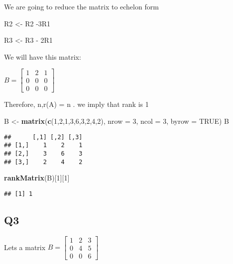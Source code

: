 \documentclass[
]{article}
\newenvironment{Shaded}{\begin{snugshade}}{\end{snugshade}}
\newcommand{\AttributeTok}[1]{\textcolor[rgb]{0.13,0.29,0.53}{#1}}
\newcommand{\ConstantTok}[1]{\textcolor[rgb]{0.56,0.35,0.01}{#1}}
\newcommand{\DecValTok}[1]{\textcolor[rgb]{0.00,0.00,0.81}{#1}}
\newcommand{\FunctionTok}[1]{\textcolor[rgb]{0.13,0.29,0.53}{\textbf{#1}}}
\newcommand{\NormalTok}[1]{#1}
\newcommand{\OtherTok}[1]{\textcolor[rgb]{0.56,0.35,0.01}{#1}}
\begin{document}
We are going to reduce the matrix to echelon form

R2 \textless- R2 -3R1

R3 \textless- R3 - 2R1

We will have this matrix:

\(B = \begin{bmatrix}1 & 2 & 1\\ 0 &0 & 0 \\ 0 & 0 & 0 \end{bmatrix}\)

Therefore, n,r(A) = n . we imply that rank is 1

\begin{Shaded}
\begin{Highlighting}[]
\NormalTok{B }\OtherTok{\textless{}{-}} \FunctionTok{matrix}\NormalTok{(}\FunctionTok{c}\NormalTok{(}\DecValTok{1}\NormalTok{,}\DecValTok{2}\NormalTok{,}\DecValTok{1}\NormalTok{,}\DecValTok{3}\NormalTok{,}\DecValTok{6}\NormalTok{,}\DecValTok{3}\NormalTok{,}\DecValTok{2}\NormalTok{,}\DecValTok{4}\NormalTok{,}\DecValTok{2}\NormalTok{), }\AttributeTok{nrow =} \DecValTok{3}\NormalTok{, }\AttributeTok{ncol =} \DecValTok{3}\NormalTok{, }\AttributeTok{byrow =} \ConstantTok{TRUE}\NormalTok{)}
\NormalTok{B}
\end{Highlighting}
\end{Shaded}

\begin{verbatim}
##      [,1] [,2] [,3]
## [1,]    1    2    1
## [2,]    3    6    3
## [3,]    2    4    2
\end{verbatim}

\begin{Shaded}
\begin{Highlighting}[]
\FunctionTok{rankMatrix}\NormalTok{(B)[}\DecValTok{1}\NormalTok{][}\DecValTok{1}\NormalTok{]}
\end{Highlighting}
\end{Shaded}

\begin{verbatim}
## [1] 1
\end{verbatim}

\hypertarget{q3}{%
\subsection{Q3}\label{q3}}

Lets a matrix
\(B = \begin{bmatrix}1 & 2 & 3\\ 0 &4 & 5 \\ 0 & 0 & 6 \end{bmatrix}\)
\end{document}
